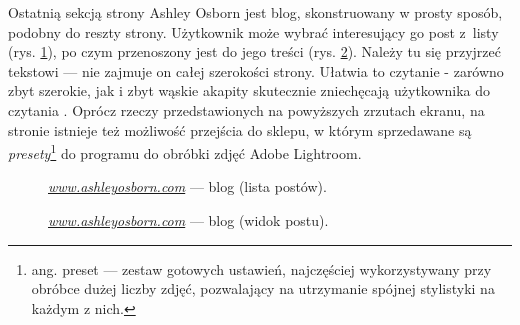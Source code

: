 \documentclass[a4paper, 12pt, twoside]{article}
\numberwithin{figure}{section}
\begin{document}
\begin{sloppypar}
Ostatnią sekcją strony Ashley Osborn jest blog, skonstruowany w prosty sposób, podobny do reszty strony. Użytkownik może wybrać interesujący go post z~listy (rys. \ref{fig:ashley-4.jpg}), po czym przenoszony jest do jego treści (rys. \ref{fig:ashley-5.jpg}). Należy tu się przyjrzeć tekstowi --- nie zajmuje on całej szerokości strony. Ułatwia to czytanie - zarówno zbyt szerokie, jak i zbyt wąskie akapity skutecznie zniechęcają użytkownika do czytania \cite{szerokosc}. Oprócz rzeczy przedstawionych na powyższych zrzutach ekranu, na stronie istnieje też możliwość przejścia do sklepu, w którym sprzedawane są \textit{presety}\footnote{ang. preset --- zestaw gotowych ustawień, najczęściej wykorzystywany przy obróbce dużej liczby zdjęć, pozwalający na utrzymanie spójnej stylistyki na każdym z nich.} do programu do obróbki zdjęć Adobe Lightroom.

\begin{figure}[H] 
    \centering
   \caption{\textit{\url{www.ashleyosborn.com}} --- blog (lista postów).}
   \label{fig:ashley-4.jpg}
\end{figure}

\begin{figure}[H] 
    \centering
   \caption{\textit{\url{www.ashleyosborn.com}} --- blog (widok postu).}
   \label{fig:ashley-5.jpg}
\end{figure}



\end{sloppypar}
\end{document}
